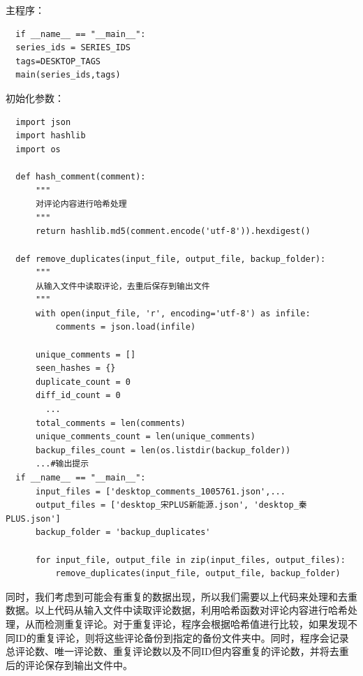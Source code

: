 \documentclass[UTF8,a4paper,15pt,titlepage,oneside]{ctexbook}
\begin{document}
主程序：

\begin{mdframed}[backgroundcolor=darkgray, linecolor=lightgray, linewidth=1pt, innermargin=0.5cm, outermargin=0.5cm, skipbelow=0.1cm]
  \color{white}
  \begin{verbatim}
  if __name__ == "__main__":
  series_ids = SERIES_IDS
  tags=DESKTOP_TAGS
  main(series_ids,tags)
\end{verbatim}
\vspace{-1.5em} %
\end{mdframed}

初始化参数：

\begin{mdframed}[backgroundcolor=darkgray, linecolor=lightgray, linewidth=1pt, innermargin=0.5cm, outermargin=0.5cm, skipbelow=0.1cm]
  \color{white}
  \begin{verbatim}
  import json
  import hashlib
  import os
  
  def hash_comment(comment):
      """
      对评论内容进行哈希处理
      """
      return hashlib.md5(comment.encode('utf-8')).hexdigest()
  
  def remove_duplicates(input_file, output_file, backup_folder):
      """
      从输入文件中读取评论，去重后保存到输出文件
      """
      with open(input_file, 'r', encoding='utf-8') as infile:
          comments = json.load(infile)
  
      unique_comments = []
      seen_hashes = {}
      duplicate_count = 0
      diff_id_count = 0
        ...
      total_comments = len(comments)
      unique_comments_count = len(unique_comments)
      backup_files_count = len(os.listdir(backup_folder))
      ...#输出提示
  if __name__ == "__main__":
      input_files = ['desktop_comments_1005761.json',...
      output_files = ['desktop_宋PLUS新能源.json', 'desktop_秦PLUS.json']
      backup_folder = 'backup_duplicates'
  
      for input_file, output_file in zip(input_files, output_files):
          remove_duplicates(input_file, output_file, backup_folder)
\end{verbatim}
\vspace{-1.5em} %
\end{mdframed}

同时，我们考虑到可能会有重复的数据出现，所以我们需要以上代码来处理和去重数据。以上代码从输入文件中读取评论数据，利用哈希函数对评论内容进行哈希处理，从而检测重复评论。对于重复评论，程序会根据哈希值进行比较，如果发现不同ID的重复评论，则将这些评论备份到指定的备份文件夹中。同时，程序会记录总评论数、唯一评论数、重复评论数以及不同ID但内容重复的评论数，并将去重后的评论保存到输出文件中。
\end{document}
